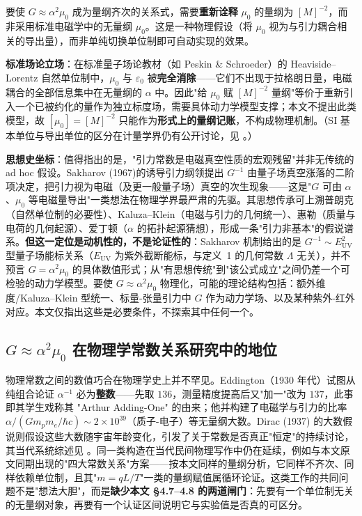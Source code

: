 \documentclass[12pt,a4paper]{article}
\begin{document}
要使 $G \approx \alpha^2\mu_0$ 成为量纲齐次的关系式，需要\textbf{重新诠释} $\mu_0$ 的量纲为 $[M]^{-2}$，而非采用标准电磁学中的无量纲 $\mu_0$。这是一种物理假设（将 $\mu_0$ 视为与引力耦合相关的导出量），而非单纯切换单位制即可自动实现的效果。

\textbf{标准场论立场}：在标准量子场论教材（如 Peskin \& Schroeder\cite{peskin1995}）的 Heaviside--Lorentz 自然单位制中，$\mu_0$ 与 $\varepsilon_0$ 被\textbf{完全消除}——它们不出现于拉格朗日量，电磁耦合的全部信息集中在无量纲的 $\alpha$ 中。因此"给 $\mu_0$ 赋 $[M]^{-2}$ 量纲"等价于重新引入一个已被约化的量作为独立标度场，需要具体动力学模型支撑；本文不提出此类模型，故 $[\mu_0] = [M]^{-2}$ 只能作为\textbf{形式上的量纲记账}，不构成物理机制。（SI 基本单位与导出单位的区分在计量学界仍有公开讨论，见 \cite{brown2023}。）

\textbf{思想史坐标}：值得指出的是，"引力常数是电磁真空性质的宏观残留"并非无传统的 ad hoc 假设。Sakharov (1967)\cite{sakharov1967}的诱导引力纲领提出 $G^{-1}$ 由量子场真空涨落的二阶项决定，把引力视为电磁（及更一般量子场）真空的次生现象——这是"$G$ 可由 $\alpha$、$\mu_0$ 等电磁量导出"一类想法在物理学界最严肃的先驱。其思想传承可上溯普朗克（自然单位制的必要性）、Kaluza--Klein（电磁与引力的几何统一）、惠勒（质量与电荷的几何起源）、爱丁顿（$\alpha$ 的拓扑起源猜想），形成一条"引力非基本"的假说谱系。\textbf{但这一定位是动机性的，不是论证性的}：Sakharov 机制给出的是 $G^{-1} \sim E_{\text{UV}}^2$ 型量子场能标关系（$E_{\text{UV}}$ 为紫外截断能标，与定义~1 的几何常数 $\Lambda$ 无关），并不预言 $G = \alpha^2\mu_0$ 的具体数值形式；从"有思想传统"到"该公式成立"之间仍差一个可检验的动力学模型。要使 $G \approx \alpha^2\mu_0$ 物理化，可能的理论结构包括：额外维度/Kaluza--Klein 型统一、标量-张量引力中 $G$ 作为动力学场、以及某种紫外-红外对应。本文仅指出这些是必要条件，不探索其中任何一个。

\subsection{$G \approx \alpha^2\mu_0$ 在物理学常数关系研究中的地位}

物理常数之间的数值巧合在物理学史上并不罕见。Eddington（1930 年代）\cite{eddington1936}试图从纯组合论证 $\alpha^{-1}$ 必为\textbf{整数}——先取 $136$，测量精度提高后又"加一"改为 $137$，此事即其学生戏称其 "Arthur Adding-One" 的由来；他并构建了电磁学与引力的比率 $\alpha/(Gm_pm_e/\hbar c) \sim 2\times10^{39}$（质子-电子）等无量纲大数。Dirac (1937) 的大数假说\cite{dirac1937}则假设这些大数随宇宙年龄变化，引发了关于常数是否真正"恒定"的持续讨论，其当代系统综述见 \cite{uzan2011}。同一类构造在当代民间物理写作中仍在延续，例如与本文原文同期出现的"四大常数关系"方案\cite{zhangxiangqian}——按本文同样的量纲分析，它同样不齐次、同样依赖单位制，且其"$m = qL/T$"一类的量纲赋值属循环论证。这类工作的共同问题不是"想法大胆"，而是\textbf{缺少本文 §4.7--4.8 的两道闸门}：先要有一个单位制无关的无量纲对象，再要有一个认证区间说明它与实验值是否真的可区分。
\end{document}
